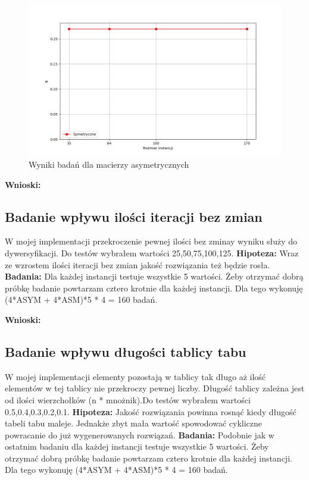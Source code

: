 \documentclass{article}
\begin{document}
        \begin{figure}[ht]
          \centering
          \includegraphics[width=\textwidth]{src/plots/asymtest.png}
          \caption{Wyniki badań dla macierzy asymetrycznych}
          \label{fig:asymFirst}
        \end{figure}
        \FloatBarrier
        \textbf{Wnioski: } 

      \subsection{Badanie wpływu ilości iteracji bez zmian}
        W mojej implementacji przekroczenie pewnej ilości bez zminay wyniku
        służy do dywersyfikacji. Do testów wybrałem wartości 25,50,75,100,125.\linebreak
        \textbf{Hipoteza: } Wraz ze wzrostem ilości iteracji bez zmian jakość
        rozwiązania też będzie rosła.\linebreak
        \textbf{Badania: } Dla każdej instancji testuje wszystkie 5 wartości. 
        Żeby otrzymać dobrą próbkę badanie powtarzam cztero krotnie dla każdej 
        instancji. Dla tego wykonuję (4*ASYM + 4*ASM)*5 * 4 = 160 badań.\linebreak

        \textbf{Wnioski: } 

      \subsection{Badanie wpływu długości tablicy tabu} 
        W mojej implementacji elementy pozostają w tablicy tak długo aż 
        ilość elementów w tej tablicy nie przekroczy pewnej liczby. Długość
        tablicy zależna jest od ilości wierzchołków (n * mnożnik).Do testów
        wybrałem wartości 0.5,0.4,0.3,0.2,0.1.\linebreak
        \textbf{Hipoteza: } Jakość rozwiązania powinna rosnąć kiedy długość
        tabeli tabu maleje. Jednakże zbyt mała wartość spowodować cykliczne 
        powracanie do już wygenerowanych rozwiązań.\linebreak
        \textbf{Badania: } Podobnie jak w ostatnim badaniu dla każdej instancji 
        testuje wszystkie 5 wartości. Żeby otrzymać dobrą próbkę badanie 
        powtarzam cztero krotnie dla każdej instancji. Dla tego wykonuję 
        (4*ASYM + 4*ASM)*5 * 4 = 160 badań.\linebreak
\end{document}
